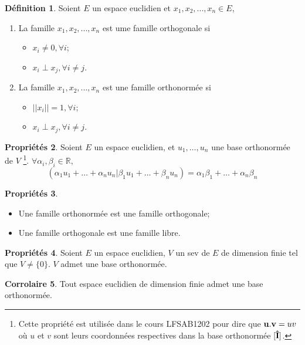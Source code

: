 \documentclass[11pt,a4paper]{article}
\theoremstyle{definition}
\newtheorem{mydef}{Définition}%
\newtheorem{myprop}[mydef]{Propriétés}
\newtheorem{mycorr}[mydef]{Corrolaire}
\newcommand{\R}{\mathbb{R}}
\newcommand*\InsertTheoremBreak{%
	\begingroup %
		\setlength\itemsep{0pt}%
		\setlength\parsep{0pt}%
		\item[\vbox{\null}]%
	\endgroup%
}%
\begin{document}
\begin{mydef}
	Soient $E$ un espace euclidien et $x_1, x_2,... ,x_n \in E$,
	\begin{enumerate}
		\item La famille $x_1, x_2,... ,x_n$ est ume famille orthogonale si
			\begin{itemize}
				\item $x_i \neq 0, \forall i$;
				\item $x_i \perp x_j, \forall i \neq j$.
			\end{itemize}

		\item La famille $x_1, x_2,... ,x_n$ est une famille orthonormée si
			\begin{itemize}
				\item $||x_i|| = 1, \forall i$;
				\item $x_i \perp x_j, \forall i \neq j$.
			\end{itemize}
	\end{enumerate}
\end{mydef}

\begin{myprop}
	Soient $E$ un espace euclidien, et $u_1, \ldots, u_n$ une base orthonormée de $V$
	\footnote{Cette propriété est utilisée dans le cours LFSAB1202 pour dire que ${\bf u}.{\bf v} = uv$
	où $u$ et $v$ sont leurs coordonnées respectives dans la base orthonormée $[{\bf\hat{I}}]$.}.
	$\forall \alpha_i, \beta_i \in \R,$
	$$(\alpha_1u_1 + \ldots + \alpha_nu_n | \beta_1u_1 + \ldots + \beta_nu_n) = \alpha_1\beta_1 + \ldots + \alpha_n\beta_n$$
\end{myprop}

\begin{myprop}\InsertTheoremBreak
	\begin{itemize}
		\item Une famille orthonormée est une famille orthogonale;
		\item Une famille orthogonale est une famille libre.
	\end{itemize}
\end{myprop}

\begin{myprop}
	Soient $E$ un espace euclidien, $V$ un sev de $E$ de dimension finie tel que $V \neq \{0\}$. $V$ admet une base orthonormée.
\end{myprop}

\begin{mycorr}
	Tout espace euclidien de dimension finie admet une base orthonormée.
\end{mycorr}
\end{document}
